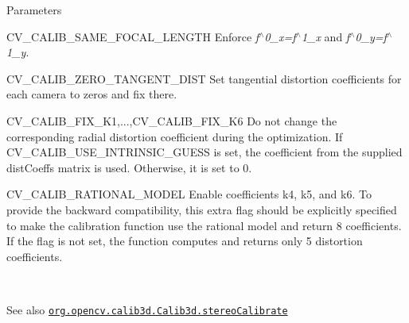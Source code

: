 {\begin{DoxyParams}{Parameters}
\begin{DoxyItemize}
\item C\+V\+\_\+\+C\+A\+L\+I\+B\+\_\+\+S\+A\+M\+E\+\_\+\+F\+O\+C\+A\+L\+\_\+\+L\+E\+N\+G\+TH Enforce {\itshape f$^\wedge$0\+\_\+x=f$^\wedge$1\+\_\+x} and {\itshape f$^\wedge$0\+\_\+y=f$^\wedge$1\+\_\+y}. 
\item C\+V\+\_\+\+C\+A\+L\+I\+B\+\_\+\+Z\+E\+R\+O\+\_\+\+T\+A\+N\+G\+E\+N\+T\+\_\+\+D\+I\+ST Set tangential distortion coefficients for each camera to zeros and fix there. 
\item C\+V\+\_\+\+C\+A\+L\+I\+B\+\_\+\+F\+I\+X\+\_\+\+K1,...,C\+V\+\_\+\+C\+A\+L\+I\+B\+\_\+\+F\+I\+X\+\_\+\+K6 Do not change the corresponding radial distortion coefficient during the optimization. If {\ttfamily C\+V\+\_\+\+C\+A\+L\+I\+B\+\_\+\+U\+S\+E\+\_\+\+I\+N\+T\+R\+I\+N\+S\+I\+C\+\_\+\+G\+U\+E\+SS} is set, the coefficient from the supplied {\ttfamily dist\+Coeffs} matrix is used. Otherwise, it is set to 0. 
\item C\+V\+\_\+\+C\+A\+L\+I\+B\+\_\+\+R\+A\+T\+I\+O\+N\+A\+L\+\_\+\+M\+O\+D\+EL Enable coefficients k4, k5, and k6. To provide the backward compatibility, this extra flag should be explicitly specified to make the calibration function use the rational model and return 8 coefficients. If the flag is not set, the function computes and returns only 5 distortion coefficients. 
\end{DoxyItemize}\\
\hline
\end{DoxyParams}
\begin{DoxySeeAlso}{See also}
\href{http://docs.opencv.org/modules/calib3d/doc/camera_calibration_and_3d_reconstruction.html#stereocalibrate}{\tt org.\+opencv.\+calib3d.\+Calib3d.\+stereo\+Calibrate} 
\end{DoxySeeAlso}
}\mbox{\label{classorg_1_1opencv_1_1calib3d_1_1_calib3d_a20929337f50b54083cde223c9fc5f9f7}} 

